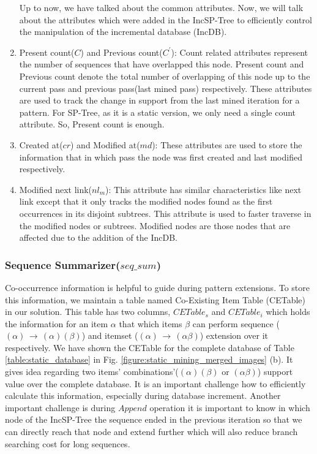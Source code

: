 \begin{enumerate}
Up to now, we have talked about the common attributes. Now, we will talk about the attributes which were added in the IncSP-Tree to efficiently control the manipulation of the incremental database (IncDB).
        \item Present count($C$) and Previous count($C^{\prime}$): Count related attributes represent the number of sequences that have overlapped this node. Present count and Previous count denote the total number of overlapping of this node up to the current pass and previous pass(last mined pass) respectively. These attributes are used to track the change in support from the last mined iteration for a pattern. For SP-Tree, as it is a static version, we only need a single count attribute. So, Present count is enough.
        \item Created at($cr$) and Modified at($md$): These attributes are used to store the information that in which pass the node was first created and last modified respectively.
        \item Modified next link($nl_{m}$): This attribute has similar characteristics like next link except that it only tracks the modified nodes found as the first occurrences in its disjoint subtrees. This attribute is used to faster traverse in the modified nodes or subtrees. Modified nodes are those nodes that are affected due to the addition of the IncDB.
       \end{enumerate}

\subsubsection{Sequence Summarizer($seq\_sum$)}
Co-occurrence information \cite{fournier2014fast,fournier2017survey} is helpful to guide during pattern extensions. To store this information, we maintain a table named Co-Existing Item Table (CETable) in our solution. This table has two columns, $CETable_{s}$ and $CETable_{i}$ which holds the information for an item $\alpha$ that which items $\beta$ can perform sequence ($(\alpha) \,\to\, (\alpha)(\beta)$) and itemset ($(\alpha) \,\to\, (\alpha\beta)$) extension over it respectively. We have shown the CETable for the complete database of Table \ref{table:static_database} in Fig. \ref{figure:static_mining_merged_images} (b). It gives idea regarding two items' combinations'($(\alpha)(\beta) \text{ or } (\alpha\beta)$) support value over the complete database. It is an important challenge how to efficiently calculate this information, especially during database increment. Another important challenge is during $Append$ operation it is important to know in which node of the IncSP-Tree the sequence ended in the previous iteration so that we can directly reach that node and extend further which will also reduce branch searching cost for long sequences.

